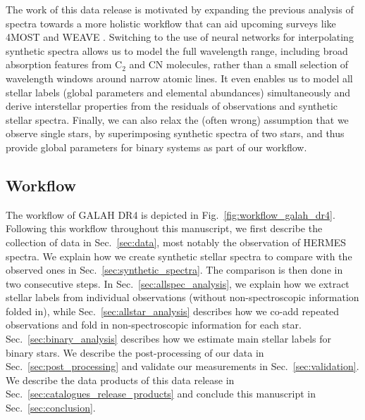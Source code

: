 \documentclass[
  journal=pasa,
  manuscript=research-paper, %
  year=2023,
  volume=37
]{cup-journal}
\begin{document}
The work of this data release is motivated by expanding the previous analysis of spectra towards a more holistic workflow that can aid upcoming surveys like 4MOST \citep{4MOST2019} and WEAVE \citep{Dalton2014}. Switching to the use of neural networks for interpolating synthetic spectra allows us to model the full wavelength range, including broad absorption features from $\mathrm{C_2}$ and CN molecules, rather than a small selection of wavelength windows around narrow atomic lines. It even enables us to model all stellar labels (global parameters and elemental abundances) simultaneously and derive interstellar properties from the residuals of observations and synthetic stellar spectra. Finally, we can also relax the (often wrong) assumption that we observe single stars, by superimposing synthetic spectra of two stars, and thus provide global parameters for binary systems as part of our workflow.

\subsection{Workflow} \label{sec:workflow}

The workflow of GALAH DR4 is depicted in Fig.~\ref{fig:workflow_galah_dr4}. Following this workflow throughout this manuscript, we first describe the collection of data in Sec.~\ref{sec:data}, most notably the observation of HERMES spectra. We explain how we create synthetic stellar spectra to compare with the observed ones in Sec.~\ref{sec:synthetic_spectra}. The comparison is then done in two consecutive steps. In Sec.~\ref{sec:allspec_analysis}, we explain how we extract stellar labels from individual observations (without non-spectroscopic information folded in), while Sec.~\ref{sec:allstar_analysis} describes how we co-add repeated observations and fold in non-spectroscopic information for each star. Sec.~\ref{sec:binary_analysis} describes how we estimate main stellar labels for binary stars. We describe the post-processing of our data in Sec.~\ref{sec:post_processing} and validate our measurements in Sec.~\ref{sec:validation}. We describe the data products of this data release in Sec.~\ref{sec:catalogues_release_products} and conclude this manuscript in Sec.~\ref{sec:conclusion}.
\end{document}
